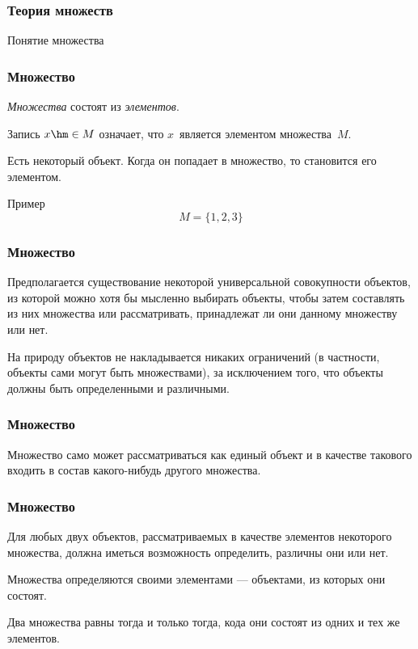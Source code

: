 \subtitle{Лекция 3 --- Теория множеств}

\frame[plain]
{\titlepage}	%


\begin{frame}
\frametitle{Теория множеств}

\begin{center}

\Huge
Понятие множества
	
\end{center}


\end{frame}

\begin{frame}
\frametitle{Множество}

\emph{Множества} состоят из \emph{элементов}.

Запись $x\hm\in M$ означает, что $x$~является элементом множества~$M$.

Есть некоторый объект. Когда он попадает в множество, то становится его \alert{элементом}.

\begin{block}{Пример}
$$ M=\{1,2,3\}$$
\end{block}

\end{frame}
\begin{frame}
\frametitle{Множество}
Предполагается существование некоторой универсальной совокупности объектов, из которой можно хотя бы мысленно выбирать объекты, чтобы затем составлять из них множества или рассматривать, принадлежат ли они данному множеству или нет. 

На природу объектов не накладывается никаких ограничений (в частности, объекты сами могут быть
множествами), за исключением того, что объекты должны быть определенными и различными. 

\end{frame}

\begin{frame}
\frametitle{Множество}
Множество само может рассматриваться как единый объект и в качестве такового входить в состав какого-нибудь другого множества.
\end{frame}

\begin{frame}
\frametitle{Множество}
Для любых двух объектов, рассматриваемых
в качестве элементов некоторого множества, должна иметься возможность определить, различны они или нет. 

Множества определяются своими элементами --- объектами, из которых они состоят. 

Два множества равны тогда и только тогда, кода они состоят из одних и тех же элементов. 
\end{frame}

